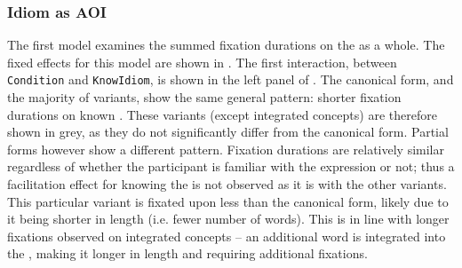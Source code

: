 \documentclass[output=paper
,modfonts
,nonflat]{langsci/langscibook}
\begin{document}
\subsubsection{Idiom as AOI}

The first model examines the summed fixation durations on the  as a whole. The fixed effects for this model are shown in . The first interaction, between \texttt{Condition} and \texttt{KnowIdiom}, is shown in the left panel of . The canonical form, and the majority of variants, show the same general pattern: shorter fixation durations on known . These variants (except integrated  concepts) are therefore shown in grey, as they do not significantly differ from the canonical form. Partial forms  however show a different pattern. Fixation durations are relatively similar regardless of whether the participant is familiar with the expression or not; thus a facilitation effect for knowing the  is not observed as it is with the other variants. This particular variant is fixated upon less than the canonical form, likely due to it being shorter in length (i.e. fewer number of words). This is in line with longer fixations observed on integrated concepts -- an additional word is integrated into the , making it longer in length and requiring additional fixations. 
\end{document}
